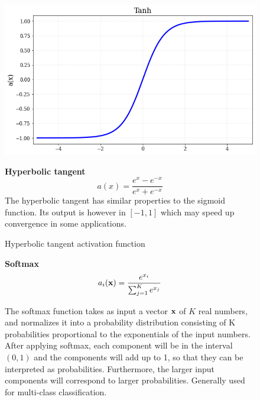 \begin{figure}[h!]
\begin{minipage}{0.45\textwidth}
    \centering
\includegraphics[width=\textwidth]{sections/03/Images/Tanh.png}
\caption{Hyperbolic tangent activation function}
    \label{fig:act_tanh}
\end{minipage}
\hfill
\begin{minipage}{0.5\textwidth}
    \textbf{Hyperbolic tangent}
   \begin{equation}
       a(x) =\frac{e^x-e^{-x}}{e^x+e^{-x}}
   \end{equation}
The hyperbolic tangent has similar properties to the sigmoid function. Its output is however in $[-1,1]$ which may speed up convergence in some applications.
\end{minipage}
\end{figure} 

\begin{figure}[h!]
\textbf{Softmax} \\

\begin{equation}
       a_i(\bold{x}) =\frac{e^{x_i}}{\sum_{j=1}^{K} e^{x_j}}
   \end{equation}
 
The softmax function takes as input a vector $\bold{x}$ of $K$ real numbers, and normalizes it into a probability distribution consisting of K probabilities proportional to the exponentials of the input numbers. After applying softmax, each component will be in the interval $\left(0,1\right)$ and the components will add up to 1, so that they can be interpreted as probabilities. Furthermore, the larger input components will correspond to larger probabilities. Generally used for multi-class classification.

\end{figure}

\vfill

